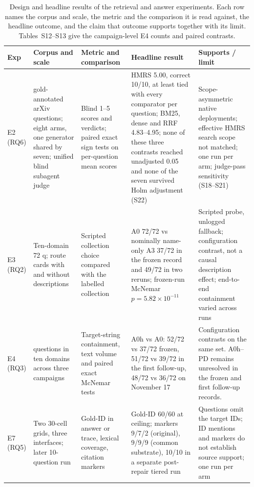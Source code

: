 \documentclass[final,5p,times,twocolumn]{elsarticle}
\begin{document}
\begin{table}[t]
\centering
\footnotesize
\setlength{\tabcolsep}{4pt}
\caption{Design and headline results of the retrieval and answer experiments.
Each row names the corpus and scale, the metric and the comparison it is read
against, the headline outcome, and the claim that outcome supports together
with its limit. Tables~S12--S13 give the campaign-level E4 counts and paired
contrasts.}
\label{tab:retrieval-design}
\begin{tabular}{@{}>{\raggedright\arraybackslash}p{}>{\raggedright\arraybackslash}p{}>{\raggedright\arraybackslash}p{}>{\raggedright\arraybackslash}p{}>{\raggedright\arraybackslash}p{}@{}}
\toprule
Exp & Corpus and scale & Metric and comparison & Headline result & Supports / limit\\
\midrule
E2 (RQ6) & 10 gold-annotated arXiv questions; eight arms, one generator shared by seven; unified blind subagent judge & Blind 1--5 scores and verdicts; paired exact sign tests on per-question mean scores & HMRS 5.00, correct 10/10, at least tied with every comparator per question; BM25, dense and RRF 4.83--4.95; none of these three contrasts reached unadjusted 0.05 and none of the seven survived Holm adjustment (S22) & Scope-asymmetric native deployments; effective HMRS search scope not matched; one run per arm; judge-pass sensitivity (S18--S21)\\
E3 (RQ2) & Ten-domain 72 q; route cards with and without descriptions & Scripted collection choice compared with the labelled collection & A0 72/72 vs nominally name-only A3 37/72 in the frozen record and 49/72 in two reruns; frozen-run McNemar $p=5.82\times10^{-11}$ & Scripted probe, unlogged fallback; configuration contrast, not a causal description effect; end-to-end containment varied across runs\\
E4 (RQ3) & 72 questions in ten domains across three campaigns & Target-string containment, text volume and paired exact McNemar tests & A0h vs A0: 52/72 vs 37/72 frozen, 51/72 vs 39/72 in the first follow-up, 48/72 vs 36/72 on November 17 & Configuration contrasts on the same set. A0h--PD remains unresolved in the frozen and first follow-up records.\\
E7 (RQ5) & Two 30-cell grids, three interfaces; later 10-question run & Gold-ID in answer or trace, lexical coverage, citation markers & Gold-ID 60/60 at ceiling; markers 9/7/2 (original), 9/9/9 (common substrate), 10/10 in a separate post-repair tiered run & Questions omit the target IDs; ID mentions and markers do not establish source support; one run per arm\\

\end{tabular}
\end{table}
\end{document}

